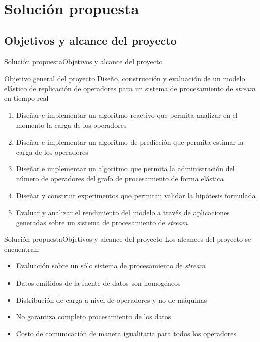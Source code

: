 \section{Solución propuesta}
\subsection*{Objetivos y alcance del proyecto}
\begin{frame}{Solución propuesta}{Objetivos y alcance del proyecto}

\begin{alertblock}{Objetivo general del proyecto}
Dise\~no, construcción y evaluaci\'on de un modelo elástico de replicación de operadores para un sistema de procesamiento de \textit{stream} en tiempo real
\end{alertblock}

\pause
\begin{enumerate}
	\item Dise\~nar e implementar un algoritmo reactivo que permita analizar en el momento la carga de los operadores
	\pause
	\item Dise\~nar e implementar un algoritmo de predicci\'on que permita estimar la carga de los operadores
	\pause
	\item Dise\~nar e implementar un algoritmo que permita la administraci\'on del número de operadores del grafo de procesamiento de forma el\'astica
	\pause
	\item Dise\~nar y construir experimentos que permitan validar la hip\'otesis formulada
	\pause
	\item Evaluar y analizar el rendimiento del modelo a trav\'es de aplicaciones generadas sobre un sistema de procesamiento de \textit{stream}
\end{enumerate}
\end{frame}

\begin{frame}{Solución propuesta}{Objetivos y alcance del proyecto}
Los alcances del proyecto se encuentran:
\begin{itemize}
	\item Evaluación sobre un sólo sistema de procesamiento de \textsl{stream}
	\item Datos emitidos de la fuente de datos son homogéneos
	\item Distribución de carga a nivel de operadores y no de máquinas
	\item No garantiza completo procesamiento de los datos
	\item Costo de comunicación de manera igualitaria para todos los operadores
\end{itemize}
\end{frame}